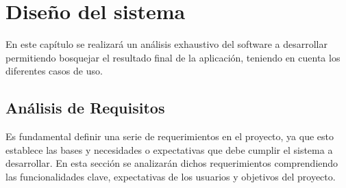 \chapter{Diseño del sistema}
En este capítulo se realizará un análisis exhaustivo del software a desarrollar permitiendo bosquejar el resultado final de la aplicación, teniendo en cuenta los diferentes casos de uso. 

\section{Análisis de Requisitos}
Es fundamental definir una serie de requerimientos en el proyecto, ya que esto establece las bases y necesidades o expectativas que debe cumplir el sistema a desarrollar. En esta sección se analizarán dichos requerimientos comprendiendo las funcionalidades clave, expectativas de los usuarios y objetivos del proyecto.

